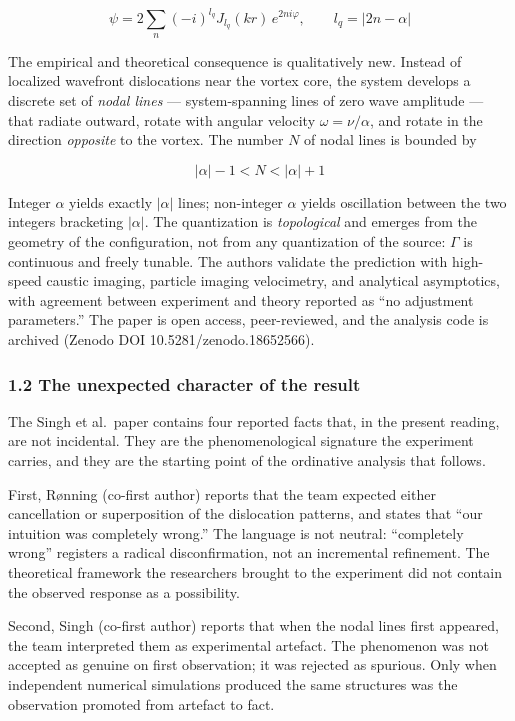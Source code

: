 \documentclass[
  11pt,
  a4paper,
]{article}
\begin{document}
\[ \psi = 2\sum_{n} (-i)^{l_q} J_{l_q}(kr) \, e^{2 n i \varphi}, \qquad l_q = |2n - \alpha| \tag{1.2} \]

The empirical and theoretical consequence is qualitatively new. Instead
of localized wavefront dislocations near the vortex core, the system
develops a discrete set of \emph{nodal lines} --- system-spanning lines
of zero wave amplitude --- that radiate outward, rotate with angular
velocity \(\omega = \nu / \alpha\), and rotate in the direction
\emph{opposite} to the vortex. The number \(N\) of nodal lines is
bounded by

\[ |\alpha| - 1 < N < |\alpha| + 1 \tag{1.3} \]

Integer \(\alpha\) yields exactly \(|\alpha|\) lines; non-integer
\(\alpha\) yields oscillation between the two integers bracketing
\(|\alpha|\). The quantization is \emph{topological} and emerges from
the geometry of the configuration, not from any quantization of the
source: \(\Gamma\) is continuous and freely tunable. The authors
validate the prediction with high-speed caustic imaging, particle
imaging velocimetry, and analytical asymptotics, with agreement between
experiment and theory reported as ``no adjustment parameters.'' The
paper is open access, peer-reviewed, and the analysis code is archived
(Zenodo DOI 10.5281/zenodo.18652566).

\subsubsection{1.2 The unexpected character of the
result}\label{the-unexpected-character-of-the-result}

The Singh et al.~paper contains four reported facts that, in the present
reading, are not incidental. They are the phenomenological signature the
experiment carries, and they are the starting point of the ordinative
analysis that follows.

First, Rønning (co-first author) reports that the team expected either
cancellation or superposition of the dislocation patterns, and states
that ``our intuition was completely wrong.'' The language is not
neutral: ``completely wrong'' registers a radical disconfirmation, not
an incremental refinement. The theoretical framework the researchers
brought to the experiment did not contain the observed response as a
possibility.

Second, Singh (co-first author) reports that when the nodal lines first
appeared, the team interpreted them as experimental artefact. The
phenomenon was not accepted as genuine on first observation; it was
rejected as spurious. Only when independent numerical simulations
produced the same structures was the observation promoted from artefact
to fact.
\end{document}
